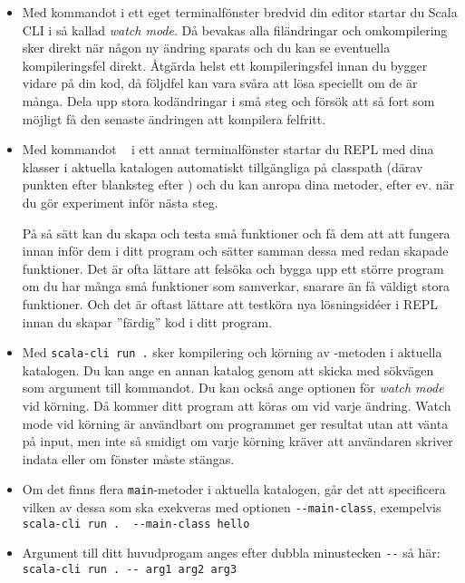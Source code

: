 \begin{itemize}
  \item Med kommandot  i ett eget terminalfönster bredvid din editor startar du Scala CLI i så kallad \textit{watch mode}. Då bevakas alla filändringar och omkompilering sker direkt när någon ny ändring sparats och du kan se eventuella kompileringsfel direkt. Åtgärda helst ett kompileringsfel innan du bygger vidare på din kod, då följdfel kan vara svåra att lösa speciellt om de är många. Dela upp stora kodändringar i små steg och försök att så fort som möjligt få den senaste ändringen att kompilera felfritt. 
  \item
    Med kommandot ~ i ett annat terminalfönster startar du REPL med dina klasser i aktuella katalogen  automatiskt tillgängliga på classpath (därav punkten efter blanksteg efter ) och du kan anropa dina metoder, efter ev.  när du gör experiment inför nästa steg. 
    
    På så sätt kan du skapa och testa små funktioner och få dem att att fungera innan inför dem i ditt program och sätter samman dessa med redan skapade funktioner. Det är ofta lättare att felsöka och bygga upp ett större program om du har många små funktioner som samverkar, snarare än få väldigt stora funktioner. Och det är oftast lättare att testköra nya lösningsidéer i REPL innan du skapar ''färdig'' kod i ditt program.
  \item
    Med \texttt{scala-cli run .} sker kompilering och körning av -metoden i aktuella katalogen. Du kan ange en annan katalog genom att skicka med sökvägen som argument till kommandot.  Du kan också ange optionen  för \textit{watch mode} vid körning. Då kommer ditt program att köras om vid varje ändring. Watch mode vid körning är användbart om programmet ger resultat utan att vänta på input, men inte så smidigt om varje körning kräver att användaren skriver indata eller om fönster måste stängas.
  \item
    Om det finns flera \texttt{main}-metoder i aktuella katalogen, går det att specificera vilken av dessa som ska exekveras med optionen \verb|--main-class|, exempelvis\\ \verb|scala-cli run .  --main-class hello| 
  \item Argument till ditt huvudprogam anges efter dubbla minustecken \verb|--| så här: \\\verb|scala-cli run . -- arg1 arg2 arg3|
\end{itemize}



